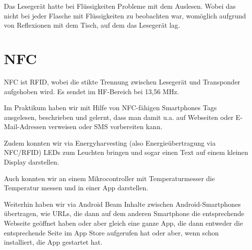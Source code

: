 \documentclass[paper=a4,fontsize=11pt,headsepline,footsepline,parskip=half]{scrartcl}
\begin{document}
Das Lesegerät hatte bei Flüssigkeiten Probleme mit dem Auslesen. Wobei das nicht bei jeder Flasche mit Flüssigkeiten zu beobachten war, womöglich
aufgrund von Reflexionen mit dem Tisch, auf dem das Lesegerät lag.

\section{NFC}

NFC ist RFID, wobei die stikte Trennung zwischen Lesegerät und Transponder aufgehoben wird. Es sendet im HF-Bereich bei 13,56 MHz.

Im Praktikum haben wir mit Hilfe von NFC-fähigen Smartphones Tags ausgelesen, beschrieben und gelernt, dass man damit u.a.
auf Webseiten oder E-Mail-Adressen verweisen oder SMS vorbereiten kann.

Zudem konnten wir via Energyharvesting (also Energieübertragung via NFC/RFID) LEDs zum Leuchten bringen und sogar einen Text auf einem kleinen
Display darstellen.

Auch konnten wir an einem Mikrocontroller mit Temperaturmesser die Temperatur messen und in einer App darstellen.

Weiterhin haben wir via Android Beam Inhalte zwischen Android-Smartphones übertragen, wie URLs, die dann auf dem anderen Smartphone die 
entsprechende Webseite geöffnet haben oder aber gleich eine ganze App, die dann entweder die entsprechende Seite im App Store aufgerufen hat oder
aber, wenn schon installiert, die App gestartet hat.
\end{document}
